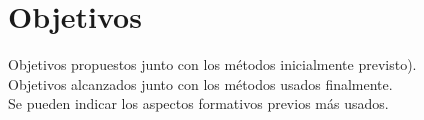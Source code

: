 %


\chapter{Objetivos}

Objetivos propuestos junto con los métodos inicialmente previsto).\\
Objetivos alcanzados junto con los métodos usados finalmente.\\
Se pueden indicar los aspectos formativos previos más usados.

\endinput
